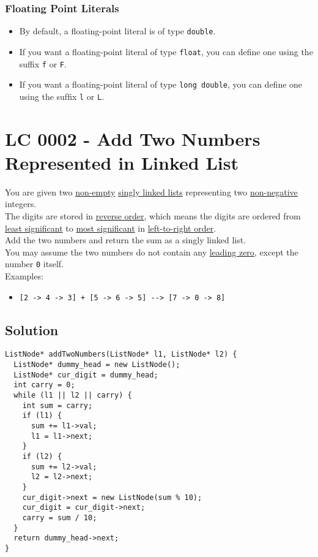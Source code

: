 \subsubsection*{Floating Point Literals}
\begin{itemize}
\item By default, a ﬂoating-point literal is of type {\colorbox{CodeBackground}{\lstinline|double|}}.
\item If you want a ﬂoating-point literal of type {\colorbox{CodeBackground}{\lstinline|float|}}, you can define one using the suffix {\colorbox{CodeBackground}{\lstinline|f|}} or {\colorbox{CodeBackground}{\lstinline|F|}}.
\item If you want a ﬂoating-point literal of type {\colorbox{CodeBackground}{\lstinline|long double|}}, you can deﬁne one using the sufﬁx {\colorbox{CodeBackground}{\lstinline|l|}} or {\colorbox{CodeBackground}{\lstinline|L|}}.
\end{itemize}

\section{LC 0002 - Add Two Numbers Represented in Linked List}\label{lc0002}
You are given two \ul{non-empty} \ul{singly linked lists} representing two \ul{non-negative} integers. \\

The digits are stored in \ul{reverse order}, which means the digits are ordered from \ul{least significant} to \ul{most significant} in \ul{left-to-right order}. \\

Add the two numbers and return the sum as a singly linked list.\\

You may assume the two numbers do not contain any \ul{leading zero}, except the number {\colorbox{CodeBackground}{\lstinline|0|}} itself.\\

Examples: 
\begin{itemize}
	\item {\colorbox{CodeBackground}{\lstinline|[2 -> 4 -> 3] + [5 -> 6 -> 5] --> [7 -> 0 -> 8]|}}
\end{itemize}

\subsection*{Solution}
\begin{lstlisting}
ListNode* addTwoNumbers(ListNode* l1, ListNode* l2) {
  ListNode* dummy_head = new ListNode();
  ListNode* cur_digit = dummy_head;
  int carry = 0;
  while (l1 || l2 || carry) {
    int sum = carry;
    if (l1) {
      sum += l1->val;
      l1 = l1->next;
    }
    if (l2) {
      sum += l2->val;
      l2 = l2->next;
    }
    cur_digit->next = new ListNode(sum % 10);
    cur_digit = cur_digit->next;
    carry = sum / 10;
  }
  return dummy_head->next;
}
\end{lstlisting}


